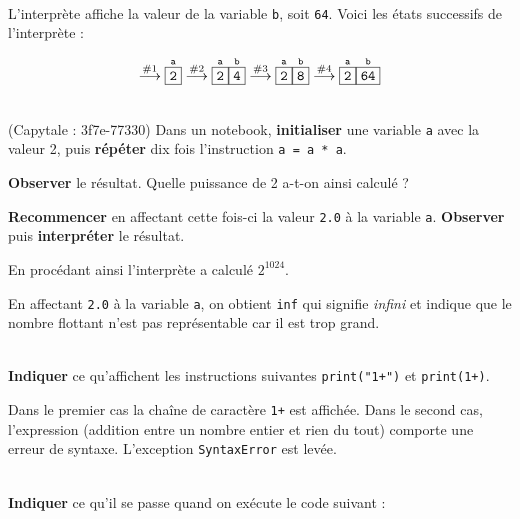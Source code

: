 \documentclass[a4paper,17pt]{extarticle}
\newenvironment{eleve}%
{\begin{activite}\color{noiramu}\\[-0.5cm]}
{\end{activite}}
\begin{document}
\begin{eleve}
        \end{eleve}\begin{reponse}
    L'interprète affiche la valeur de la variable \texttt{b}, soit
\texttt{64}. Voici les états successifs de l'interprète :

\[
\overset{\text{\#1}}\longrightarrow
\overset{\texttt{a}}{\fbox{\texttt{2}}}
\overset{\text{\#2}}\longrightarrow
\overset{\texttt{a}}{\fbox{\texttt{2}}}
\overset{\texttt{b}}{\fbox{\texttt{4}}}
\overset{\text{\#3}}\longrightarrow
\overset{\texttt{a}}{\fbox{\texttt{2}}}
\overset{\texttt{b}}{\fbox{\texttt{8}}}
\overset{\text{\#4}}\longrightarrow
\overset{\texttt{a}}{\fbox{\texttt{2}}}
\overset{\texttt{b}}{\fbox{\texttt{64}}}
\]

        \end{reponse}\begin{eleve}
    (Capytale : 3f7e-77330) Dans un notebook, \textbf{initialiser} une
variable \texttt{a} avec la valeur 2, puis \textbf{répéter} dix fois
l'instruction \texttt{a\ =\ a\ *\ a}.

\textbf{Observer} le résultat. Quelle puissance de 2 a-t-on ainsi
calculé ?

\textbf{Recommencer} en affectant cette fois-ci la valeur \texttt{2.0} à
la variable \texttt{a}. \textbf{Observer} puis \textbf{interpréter} le
résultat.
        
        \end{eleve}\begin{reponse}
    En procédant ainsi l'interprète a calculé \(2^{1024}\).

En affectant \texttt{2.0} à la variable \texttt{a}, on obtient
\texttt{inf} qui signifie \emph{infini} et indique que le nombre
flottant n'est pas représentable car il est trop grand.

        \end{reponse}\begin{eleve}
    \textbf{Indiquer} ce qu'affichent les instructions suivantes
\texttt{print("1+")} et \texttt{print(1+)}.
        
        \end{eleve}\begin{reponse}
    Dans le premier cas la chaîne de caractère \texttt{1+} est affichée.
Dans le second cas, l'expression (addition entre un nombre entier et
rien du tout) comporte une erreur de syntaxe. L'exception
\texttt{SyntaxError} est levée.

        \end{reponse}\begin{eleve}
    \textbf{Indiquer} ce qu'il se passe quand on exécute le code suivant :


\end{eleve}
\end{document}
